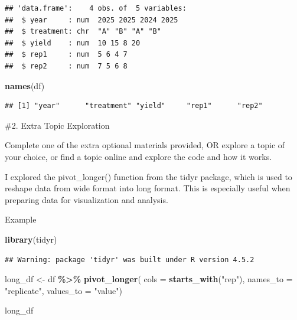 \documentclass[
]{article}
\newenvironment{Shaded}{\begin{snugshade}}{\end{snugshade}}
\newcommand{\AttributeTok}[1]{\textcolor[rgb]{0.13,0.29,0.53}{#1}}
\newcommand{\FunctionTok}[1]{\textcolor[rgb]{0.13,0.29,0.53}{\textbf{#1}}}
\newcommand{\NormalTok}[1]{#1}
\newcommand{\OtherTok}[1]{\textcolor[rgb]{0.56,0.35,0.01}{#1}}
\newcommand{\SpecialCharTok}[1]{\textcolor[rgb]{0.81,0.36,0.00}{\textbf{#1}}}
\newcommand{\StringTok}[1]{\textcolor[rgb]{0.31,0.60,0.02}{#1}}
\begin{document}
\begin{verbatim}
## 'data.frame':    4 obs. of  5 variables:
##  $ year     : num  2025 2025 2024 2025
##  $ treatment: chr  "A" "B" "A" "B"
##  $ yield    : num  10 15 8 20
##  $ rep1     : num  5 6 4 7
##  $ rep2     : num  7 5 6 8
\end{verbatim}

\begin{Shaded}
\begin{Highlighting}[]
\FunctionTok{names}\NormalTok{(df)}
\end{Highlighting}
\end{Shaded}

\begin{verbatim}
## [1] "year"      "treatment" "yield"     "rep1"      "rep2"
\end{verbatim}

\#2. Extra Topic Exploration

Complete one of the extra optional materials provided, OR explore a
topic of your choice, or find a topic online and explore the code and
how it works.

I explored the pivot\_longer() function from the tidyr package, which is
used to reshape data from wide format into long format. This is
especially useful when preparing data for visualization and analysis.

Example

\begin{Shaded}
\begin{Highlighting}[]
\FunctionTok{library}\NormalTok{(tidyr)}
\end{Highlighting}
\end{Shaded}

\begin{verbatim}
## Warning: package 'tidyr' was built under R version 4.5.2
\end{verbatim}

\begin{Shaded}
\begin{Highlighting}[]
\NormalTok{long\_df }\OtherTok{\textless{}{-}}\NormalTok{ df }\SpecialCharTok{\%\textgreater{}\%}
  \FunctionTok{pivot\_longer}\NormalTok{(}
    \AttributeTok{cols =} \FunctionTok{starts\_with}\NormalTok{(}\StringTok{"rep"}\NormalTok{),}
    \AttributeTok{names\_to =} \StringTok{"replicate"}\NormalTok{,}
    \AttributeTok{values\_to =} \StringTok{"value"}\NormalTok{)}

\NormalTok{long\_df}
\end{Highlighting}
\end{Shaded}
\end{document}

